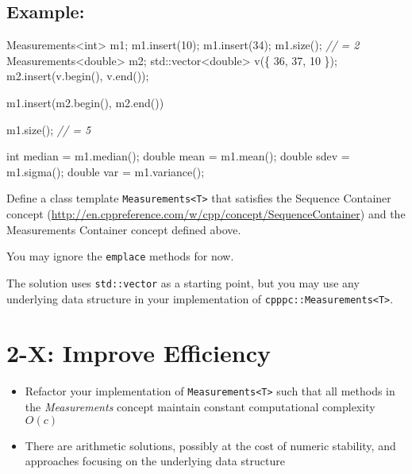 \documentclass[]{article}
\newenvironment{Shaded}{}{}
\newcommand{\DataTypeTok}[1]{\textcolor[rgb]{0.56,0.13,0.00}{{#1}}}
\newcommand{\DecValTok}[1]{\textcolor[rgb]{0.25,0.63,0.44}{{#1}}}
\newcommand{\CommentTok}[1]{\textcolor[rgb]{0.38,0.63,0.69}{\textit{{#1}}}}
\newcommand{\NormalTok}[1]{{#1}}
\providecommand{\tightlist}{%
  \setlength{\itemsep}{0pt}\setlength{\parskip}{0pt}}
\begin{document}
\subsection{Example:}\label{example}

\begin{Shaded}
\begin{Highlighting}[]
\NormalTok{Measurements<}\DataTypeTok{int}\NormalTok{> m1;}
\NormalTok{m1.insert(}\DecValTok{10}\NormalTok{);}
\NormalTok{m1.insert(}\DecValTok{34}\NormalTok{);}
\NormalTok{m1.size(); }\CommentTok{// = 2}
\NormalTok{Measurements<}\DataTypeTok{double}\NormalTok{> m2;}
\NormalTok{std::vector<}\DataTypeTok{double}\NormalTok{> v(\{ }\DecValTok{36}\NormalTok{, }\DecValTok{37}\NormalTok{, }\DecValTok{10} \NormalTok{\});}
\NormalTok{m2.insert(v.begin(), v.end());}

\NormalTok{m1.insert(m2.begin(), m2.end())}

\NormalTok{m1.size(); }\CommentTok{// = 5}

\DataTypeTok{int}    \NormalTok{median = m1.median();}
\DataTypeTok{double} \NormalTok{mean   = m1.mean();}
\DataTypeTok{double} \NormalTok{sdev   = m1.sigma();}
\DataTypeTok{double} \NormalTok{var    = m1.variance();}
\end{Highlighting}
\end{Shaded}

Define a class template \texttt{Measurements\textless{}T\textgreater{}}
that satisfies the Sequence Container concept
(\url{http://en.cppreference.com/w/cpp/concept/SequenceContainer}) and
the Measurements Container concept defined above.

You may ignore the \texttt{emplace} methods for now.

The solution uses \texttt{std::vector} as a starting point, but you may
use any underlying data structure in your implementation of
\texttt{cpppc::Measurements\textless{}T\textgreater{}}.

\section{2-X: Improve Efficiency}\label{x-improve-efficiency}

\begin{itemize}
\tightlist
\item
  Refactor your implementation of
  \texttt{Measurements\textless{}T\textgreater{}} such that all methods
  in the \emph{Measurements} concept maintain constant computational
  complexity \(O(c)\)
\item
  There are arithmetic solutions, possibly at the cost of numeric
  stability, and approaches focusing on the underlying data structure
\end{itemize}
\end{document}
